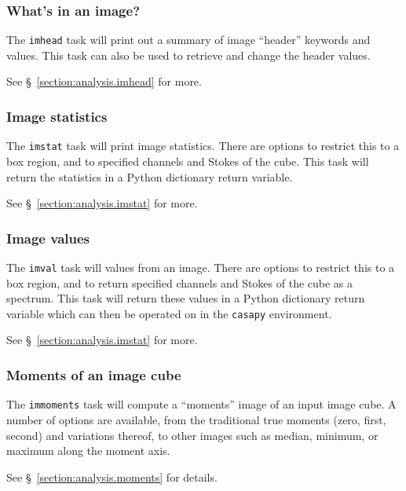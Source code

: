 \subsubsection{What's in an image?}
\label{section:intro.walkthru.analysis.imhead}

The {\tt imhead} task will print out a summary of image ``header'' 
keywords and values.  This task can also be
used to retrieve and change the header values.

See \S~\ref{section:analysis.imhead} for more.

\subsubsection{Image statistics}
\label{section:intro.walkthru.analysis.imstat}

The {\tt imstat} task will print image statistics.  There are options
to restrict this to a box region, and to specified channels and Stokes
of the cube.  This task will return the statistics in a Python
dictionary return variable.

See \S~\ref{section:analysis.imstat} for more.

\subsubsection{Image values}
\label{section:intro.walkthru.analysis.imval}

The {\tt imval} task will values from an image.  There are options
to restrict this to a box region, and to return specified channels and Stokes
of the cube as a spectrum.  This task will return these values in a Python
dictionary return variable which can then be operated on in the 
{\tt casapy} environment.

See \S~\ref{section:analysis.imstat} for more.

\subsubsection{Moments of an image cube}
\label{section:intro.walkthru.analysis.moments}

The {\tt immoments} task will compute a ``moments'' image of
an input image cube.  A number of options are available, from
the traditional true moments (zero, first, second) and variations
thereof, to other images such as median, minimum, or maximum along
the moment axis.

See \S~\ref{section:analysis.moments} for details.


